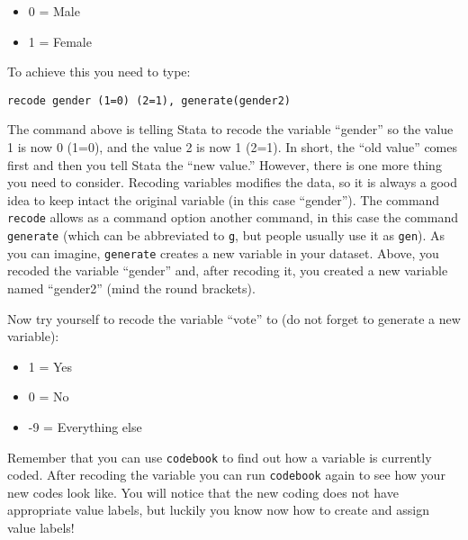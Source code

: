 \documentclass{article}
\begin{document}
\begin{itemize}
	\item 0 = Male
	\item 1 = Female
\end{itemize}

To achieve this you need to type:

\begin{lstlisting}
recode gender (1=0) (2=1), generate(gender2) 
\end{lstlisting}

The command above is telling Stata to recode the variable ``gender'' so the value 1 is now 0 (1=0), and the value 2 is now 1 (2=1). In short, the ``old value'' comes first and then you tell Stata the ``new value.'' However, there is one more thing you need to consider. Recoding variables modifies the data, so it is always a good idea to keep intact the original variable (in this case ``gender''). The command \texttt{recode} allows as a command option another command, in this case the command \texttt{generate} (which can be abbreviated to \texttt{g}, but people usually use it as \texttt{gen}). As you can imagine, \texttt{generate} creates a new variable in your dataset. Above, you recoded the variable ``gender'' and, after recoding it, you created a new variable named ``gender2'' (mind the round brackets).

Now try yourself to recode the variable ``vote'' to (do not forget to generate a new variable):

\begin{itemize}
	\item 1 = Yes
	\item 0 = No
	\item -9 = Everything else
\end{itemize}

Remember that you can use \texttt{codebook} to find out how a variable is currently coded. After recoding the variable you can run \texttt{codebook} again to see how your new codes look like. You will notice that the new coding does not have appropriate value labels, but luckily you know now how to create and assign value labels!
\end{document}
